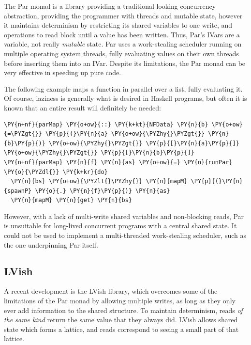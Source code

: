 The Par monad\cite{parmonad} is a library providing a
traditional-looking concurrency abstraction, providing the programmer
with threads and mutable state, however it maintains determinism by
restricting its shared variables to one write, and operations to read
block until a value has been written. Thus, Par's IVars are a
variable, not really \textit{mutable} state. Par uses a work-stealing
scheduler running on multiple operating system threads, fully
evaluating values on their own threads before inserting them into an
IVar. Despite its limitations, the Par monad can be very effective in
speeding up pure code.

The following example maps a function in parallel over a list, fully
evaluating it. Of course, laziness is generally what is desired in
Haskell programs, but often it is known that an entire result will
definitely be needed:


\begin{Verbatim}[commandchars=\\\{\}]
\PY{n+nf}{parMap} \PY{o+ow}{::} \PY{k+kt}{NFData} \PY{n}{b} \PY{o+ow}{=\PYZgt{}} \PY{p}{(}\PY{n}{a} \PY{o+ow}{\PYZhy{}\PYZgt{}} \PY{n}{b}\PY{p}{)} \PY{o+ow}{\PYZhy{}\PYZgt{}} \PY{p}{[}\PY{n}{a}\PY{p}{]} \PY{o+ow}{\PYZhy{}\PYZgt{}} \PY{p}{[}\PY{n}{b}\PY{p}{]}
\PY{n+nf}{parMap} \PY{n}{f} \PY{n}{as} \PY{o+ow}{=} \PY{n}{runPar} \PY{o}{\PYZdl{}} \PY{k+kr}{do}
  \PY{n}{bs} \PY{o+ow}{\PYZlt{}\PYZhy{}} \PY{n}{mapM} \PY{p}{(}\PY{n}{spawnP} \PY{o}{.} \PY{n}{f}\PY{p}{)} \PY{n}{as}
  \PY{n}{mapM} \PY{n}{get} \PY{n}{bs}
\end{Verbatim}

However, with a lack of multi-write shared variables and non-blocking
reads, Par is unsuitable for long-lived concurrent programs with a
central shared state. It could not be used to implement a
multi-threaded work-stealing scheduler, such as the one underpinning
Par itself.

\subsection*{LVish}
\label{sec:dejafu-par-lvish}

A recent development is the LVish\cite{lvish} library, which overcomes
some of the limitations of the Par monad by allowing multiple writes,
as long as they only ever add information to the shared structure. To
maintain determinism, reads \textit{of the same kind} return the same
value that they always did. LVish allows shared state which forms a
lattice, and reads correspond to seeing a small part of that lattice.

